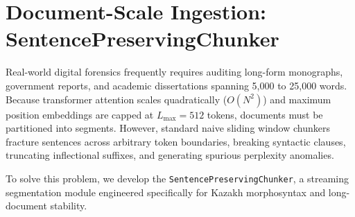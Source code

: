\section{Document-Scale Ingestion: SentencePreservingChunker}
\label{sec:document_chunker}

Real-world digital forensics frequently requires auditing long-form monographs, government reports, and academic dissertations spanning 5,000 to 25,000 words. Because transformer attention scales quadratically ($O(N^2)$) and maximum position embeddings are capped at $L_{\max} = 512$ tokens, documents must be partitioned into segments. However, standard naive sliding window chunkers fracture sentences across arbitrary token boundaries, breaking syntactic clauses, truncating inflectional suffixes, and generating spurious perplexity anomalies.

To solve this problem, we develop the \texttt{SentencePreservingChunker}, a streaming segmentation module engineered specifically for Kazakh morphosyntax and long-document stability.

